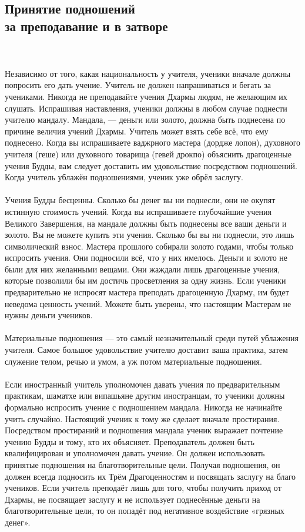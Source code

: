 \subsection{Принятие подношений \\за преподавание и в затворе}
\\ \\ Независимо от того, какая национальность у учителя, ученики вначале должны попросить его дать учение. Учитель не должен напрашиваться и бегать за учениками. Никогда не преподавайте учения Дхармы людям, не желающим их слушать. Испрашивая наставления, ученики должны в любом случае поднести учителю мандалу. Мандала, — деньги или золото, должна быть поднесена по причине величия учений Дхармы. Учитель может взять себе всё, что ему поднесено. Когда вы испрашиваете ваджрного мастера (дордже лопон), духовного учителя (геше) или духовного товарища (гевей дрокпо) объяснить драгоценные учения Будды, вам следует доставить им удовольствие посредством подношений. Когда учитель ублажён подношениями, ученик уже обрёл заслугу.
\\ \\ Учения Будды бесценны. Сколько бы денег вы ни поднесли, они не окупят истинную стоимость учений. Когда вы испрашиваете глубочайшие учения Великого Завершения, на мандале дол\-жны быть поднесены все ваши деньги и золото. Вы не можете купить эти учения. Сколько бы вы ни поднесли, это лишь символический взнос. Мастера прошлого собирали золото годами, чтобы только испросить учения. Они подносили всё, что у них имелось. Деньги и золото не были для них желанными вещами. Они жаждали лишь драгоценные учения, которые позволили бы им достичь просветления за одну жизнь. Если ученики предварительно не испросят мастера преподать драгоценную Дхарму, им будет неведома ценность учений. Можете быть уверены, что настоящим Мастерам не нужны деньги учеников.
\\ \\ Материальные подношения — это самый незначительный среди путей ублажения учителя. Самое большое удовольствие учите\-лю доставит ваша практика, затем служение телом, речью и умом, а уж потом материальные подношения.
\\ \\ Если иностранный учитель уполномочен давать учения по предварительным практикам, шаматхе или випашьяне другим иностранцам, то ученики должны формально испросить учение с подношением мандала. Никогда не начинайте учить случай\-но. Настоящий ученик к тому же сделает вначале простирания. Посредством простираний и подношения мандала ученик вы\-ражает почтение учению Будды и тому, кто их объясняет. Преподаватель должен быть квалифицирован и уполномочен давать учение. Он должен использовать принятые подношения на благотвори\-тельные цели. Получая подношения, он должен всегда подносить их Трём Драгоценностям и посвя\-щать заслу\-гу на благо учеников. Если учитель преподаёт лишь для того, чтобы получить приход от Дхармы, не посвящает заслугу и не использует поднесённые деньги на благотвори\-тельные цели, то он попадёт под негативное воздействие «грязных денег».
